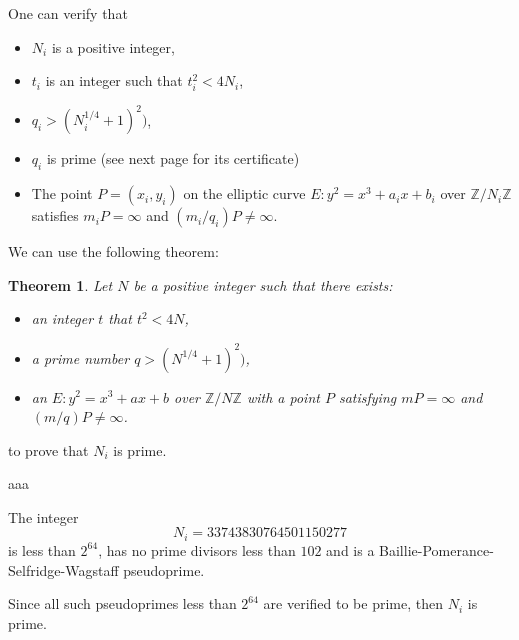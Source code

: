 \documentclass[12pt]{extarticle}
\newtheorem*{theorem*}{Theorem}
\begin{document}
\begin{multicols}{3}
\noindent One can verify that
\begin{itemize}
\item $N_i$ is a positive integer,
\item $t_i$ is an integer such that $t_i^2 < 4N_i$,
\item $q_i > (N_i^{1/4} + 1)^2)$,
\item $q_i$ is prime (see next page for its certificate)
\item The point $P = (x_i, y_i)$ on the elliptic curve $E: y^2 = x^3 + a_ix + b_i$ over $\mathbb{Z}/{N_i}\mathbb{Z}$ satisfies $m_iP = \infty$ and $(m_i/q_i)P \neq \infty$.
\end{itemize}
\columnbreak
\noindent We can use the following theorem:
\begin{theorem*}
Let $N$ be a positive integer such that there exists:
\begin{itemize}
\item an integer $t$ that $t^2 < 4N$,
\item a prime number $q > (N^{1/4} + 1)^2)$,
\item an $E: y^2 = x^3 + ax + b$ over $\mathbb{Z}/{N}\mathbb{Z}$ with a point $P$ satisfying $mP = \infty$ and $(m/q)P \neq \infty$.
\end{itemize}
\end{theorem*}
\noindent to prove that $N_i$ is prime.

\columnbreak

aaa
\end{multicols}

\newpage


\pagestyle{empty}
\phantom{a}
\vspace{2em}

\begin{center}
{\Huge {}}
\end{center}
\vspace{2em}

\noindent The integer
{\Huge
$$
N_i = 33743830764501150277
$$
}
is less than $2^{64}$, has no prime divisors less than $102$ and is a Baillie-Pomerance-Selfridge-Wagstaff pseudoprime.

\vspace{2em}
\noindent Since all such pseudoprimes less than $2^{64}$ are verified to be prime, then $N_i$ is prime.
\end{document}
